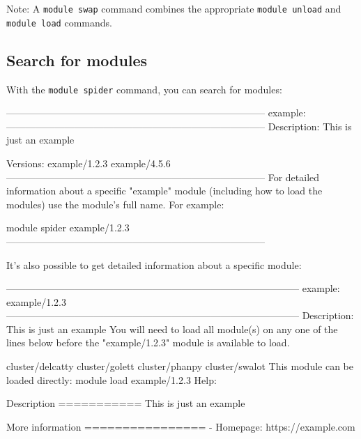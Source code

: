 Note: A \lstinline|module swap| command combines the appropriate \lstinline|module unload|
and \lstinline|module load| commands.

\ifusinglmod
\subsection{Search for modules}

With the \lstinline|module spider| command, you can search for modules:

\begin{prompt}
--------------------------------------------------------------------------------
  example:
--------------------------------------------------------------------------------
    Description:
      This is just an example

     Versions:
        example/1.2.3
        example/4.5.6
--------------------------------------------------------------------------------
  For detailed information about a specific "example" module (including how to
  load the modules) use the module's full name.
  For example:

     module spider example/1.2.3
--------------------------------------------------------------------------------
\end{prompt}

It's also possible to get detailed information about a specific module:

\begin{prompt}
------------------------------------------------------------------------------------------
  example: example/1.2.3
------------------------------------------------------------------------------------------
    Description:
      This is just an example
    You will need to load all module(s) on any one of the lines below before the "example/1.2.3" module is available to load.

      cluster/delcatty
      cluster/golett
      cluster/phanpy
      cluster/swalot
    This module can be loaded directly: module load example/1.2.3
    Help:

      Description
      ===========
      This is just an example


      More information
      ================
       - Homepage: https://example.com

\end{prompt}

